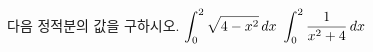 다음 정적분의 값을 구하시오.
 $\displaystyle\int_{0}^{2}\sqrt{4-x^2}\mkern3mu dx$
 $\displaystyle\int_{0}^{2}\dfrac{1}{x^2+4}\mkern3mu dx$
